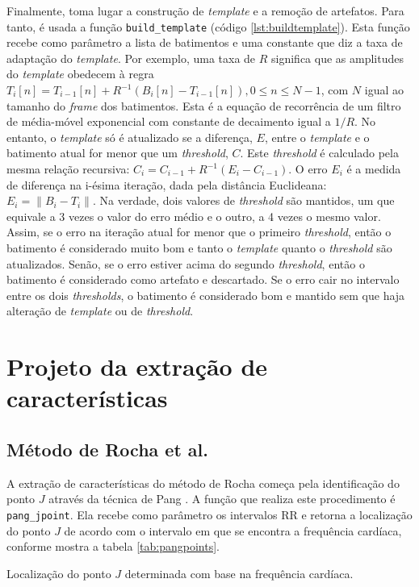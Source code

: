 Finalmente, toma lugar a construção de \emph{template} e a remoção de artefatos. Para tanto, é usada a função \texttt{build\_template} (código \ref{lst:buildtemplate}). Esta função recebe como parâmetro a lista de batimentos e uma constante que diz a taxa de adaptação do \emph{template}. Por exemplo, uma taxa de $R$ significa que as amplitudes do \emph{template} obedecem à regra $T_i[n] = T_{i-1}[n] + R^{-1}\left(B_i[n] - T_{i-1}[n]\right), 0 \leq n \leq N-1$, com $N$ igual ao tamanho do \emph{frame} dos batimentos. Esta é a equação de recorrência de um filtro de média-móvel exponencial com constante de decaimento igual a $1/R$. No entanto, o \emph{template} só é atualizado se a diferença, $E$, entre o \emph{template} e o batimento atual for menor que um \emph{threshold}, $C$. Este \emph{threshold} é calculado pela mesma relação recursiva: $C_i = C_{i-1} + R^{-1}\left(E_i - C_{i-1}\right)$. O erro $E_i$ é a medida de diferença na i-ésima iteração, dada pela distância Euclideana: $E_i = \|B_i - T_i\|$. Na verdade, dois valores de \emph{threshold} são mantidos, um que equivale a 3 vezes o valor do erro médio e o outro, a 4 vezes o mesmo valor. Assim, se o erro na iteração atual for menor que o primeiro \emph{threshold}, então o batimento é considerado muito bom e tanto o \emph{template} quanto o \emph{threshold} são atualizados. Senão, se o erro estiver acima do segundo \emph{threshold}, então o batimento é considerado como artefato e descartado. Se o erro cair no intervalo entre os dois \emph{thresholds}, o batimento é considerado bom e mantido sem que haja alteração de \emph{template} ou de \emph{threshold}.


\section{Projeto da extração de características}

\subsection*{Método de Rocha et al.}
A extração de características do método de Rocha começa pela identificação do ponto $J$ através da técnica de Pang \cite{Pang2005}. A função que realiza este procedimento é \texttt{pang\_jpoint}. Ela recebe como parâmetro os intervalos RR e retorna a localização do ponto $J$ de acordo com o intervalo em que se encontra a frequência cardíaca, conforme mostra a tabela \ref{tab:pangpoints}.

\begin{table}[ht!]
    \centering
    
    \caption[Localização do ponto $J$ determinada com base na frequência cardíaca]{Localização do ponto $J$ determinada com base na frequência cardíaca.}
    \label{tab:pangpoints}
\end{table}

